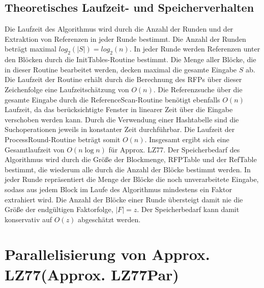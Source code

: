 \subsection{Theoretisches Laufzeit- und Speicherverhalten}
Die Laufzeit des Algorithmus wird durch die Anzahl der Runden und der Extraktion von Referenzen in jeder Runde bestimmt. Die Anzahl der Runden beträgt maximal $log_2(|S|)=log_2(n)$. In jeder Runde
werden Referenzen unter den Blöcken durch die InitTables-Routine bestimmt. Die Menge aller Blöcke, die in dieser Routine bearbeitet werden, decken maximal die gesamte Eingabe $S$ ab. Die Laufzeit
der Routine erhält durch die Berechnung des RFPs über dieser Zeichenfolge eine Laufzeitschätzung von $O(n)$. Die Referenzsuche über die gesamte Eingabe durch die ReferenceScan-Routine benötigt ebenfalls
$O(n)$ Laufzeit, da das berücksichtigte Fenster in linearer Zeit über die Eingabe verschoben werden kann. Durch die Verwendung einer Hashtabelle sind die Suchoperationen jeweils in konstanter Zeit
durchführbar. Die Laufzeit der ProcessRound-Routine beträgt somit $O(n)$. Insgesamt ergibt sich eine Gesamtlaufzeit von $O(n\log{n})$ für Approx. LZ77. 
Der Speicherbedarf des Algorithmus wird durch die Größe der Blockmenge, RFPTable und der RefTable bestimmt, die wiederum alle durch die Anzahl der Blöcke bestimmt werden. In jeder Runde repräsentiert 
die Menge der Blöcke die noch unverarbeitete Eingabe, sodass aus jedem Block im Laufe des Algorithmus mindestens ein Faktor extrahiert wird. Die Anzahl der Blöcke einer Runde übersteigt damit nie die 
Größe der endgültigen Faktorfolge, $|F|=z$. Der Speicherbedarf kann damit konservativ auf $O(z)$ abgeschätzt werden.

\section{Parallelisierung von Approx. LZ77(Approx. LZ77Par)}
